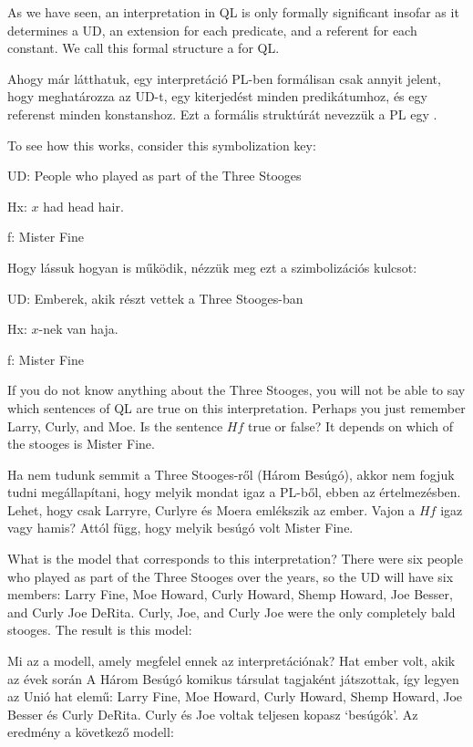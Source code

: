 As we have seen, an interpretation in QL is only formally significant insofar as it determines a UD, an extension for each predicate, and a referent for each constant. We call this formal structure a  for QL.

Ahogy már látthatuk, egy interpretáció PL-ben formálisan csak annyit jelent, hogy meghatározza az UD-t, egy kiterjedést minden predikátumhoz, és egy referenst minden konstanshoz.  Ezt a formális struktúrát nevezzük a PL egy .

To see how this works, consider this symbolization key:
\begin{ekey}
\item[UD:]People who played as part of the Three Stooges
\item[Hx:]$x$ had head hair.
\item[f:] Mister Fine
\end{ekey}

Hogy lássuk hogyan is működik, nézzük meg ezt a szimbolizációs kulcsot:
\begin{ekey}
\item[UD:]Emberek, akik részt vettek a Three Stooges-ban
\item[Hx:]$x$-nek van haja.
\item[f:] Mister Fine
\end{ekey}

If you do not know anything about the Three Stooges, you will not be able to say which sentences of QL are true on this interpretation. Perhaps you just remember Larry, Curly, and Moe. Is the sentence $Hf$ true or false? It depends on which of the stooges is Mister Fine.

Ha nem tudunk semmit a Three Stooges-ről (Három Besúgó), akkor nem fogjuk tudni megállapítani, hogy melyik mondat igaz a PL-ből, ebben az értelmezésben. Lehet, hogy csak Larryre, Curlyre és Moera emlékszik az ember. Vajon a $Hf$ igaz vagy hamis? Attól függ, hogy melyik besúgó volt Mister Fine.



What is the model that corresponds to this interpretation? There were six people who played as part of the Three Stooges over the years, so the UD will have six members: Larry Fine, Moe Howard, Curly Howard, Shemp Howard, Joe Besser, and Curly Joe DeRita. Curly, Joe, and Curly Joe were the only completely bald stooges. The result is this model:

Mi az a modell, amely megfelel ennek az interpretációnak? Hat ember volt, akik az évek során A Három Besúgó komikus társulat tagjaként játszottak, így legyen az Unió hat elemű: Larry Fine, Moe Howard, Curly Howard, Shemp Howard, Joe Besser és Curly DeRita. Curly és Joe voltak teljesen kopasz `besúgók'. Az eredmény a következő modell:

